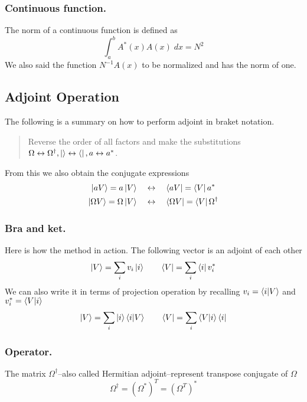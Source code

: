 \documentclass[../main.tex]{subfiles}
\begin{document}
\subsubsection*{Continuous function.}
The norm of a continuous function is defined as
\begin{equation*}
	\int_{a}^{b}A^*(x)A(x)\;dx=N^2
\end{equation*}
We also said the function $N^{-1}A(x)$ to be normalized and has the norm of one.

\subsection*{Adjoint Operation}
The following is a summary on how to perform adjoint in braket notation.
\begin{quotation}
	Reverse the order of all factors and make the substitutions $\Omega\leftrightarrow\Omega^\dagger,\ket{}\leftrightarrow \bra{}, a\leftrightarrow a^*$.
\end{quotation}
From this we also obtain the conjugate expressions
\begin{align*}
	\ket{aV}=a \ket{V}\quad            & \leftrightarrow \quad\bra{aV}=\bra{V}a^*                 \\
	\ket{\Omega V}=\Omega \ket{V}\quad & \leftrightarrow\quad\bra{\Omega V}=\bra{V}\Omega^\dagger
\end{align*}

\subsubsection*{Bra and ket.}
Here is how the method in action.
The following vector is an adjoint of each other
\begin{equation*}
	\ket{V}=\sum_iv_i \ket{i}\qquad \bra{V}=\sum_i \bra{i}v_i^*
\end{equation*}
We can also write it in terms of projection operation by recalling $v_i=\braket{i|V}$ and $v_i^*=\braket{V|i}$
\begin{equation*}
	\ket{V}=\sum_i \ket{i} \braket{i|V}\qquad \bra{V}=\sum_i \braket{V|i}\bra{i}
\end{equation*}

\subsubsection*{Operator.}
The matrix $\Omega^\dagger$--also called Hermitian adjoint--represent transpose conjugate of $\Omega$
\begin{equation*}
	\Omega^{\dagger}=(\Omega^*)^T=(\Omega^T)^*
\end{equation*}
\end{document}
